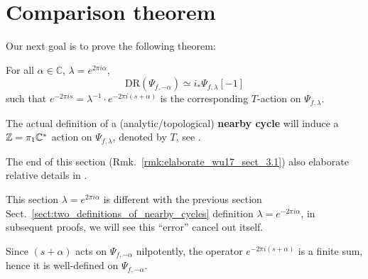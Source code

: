 \section{Comparison theorem}
Our next goal is to prove the following theorem:
\begin{theorem}[Comparison] \label{Theorem 9.5}
    For all $\alpha \in \mathbb{C}$, $\lambda = e^{2\pi i\alpha}$,
    $$
        \mathrm{DR}(\Psi_{f,-\alpha}) \simeq i_* \Psi_{f,\lambda}[-1]
    $$
    such that $e^{-2\pi is} = \lambda^{-1}\cdot e^{-2\pi i(s+\alpha)}$ is the corresponding $T$-action on $\Psi_{f,\lambda}$.
\end{theorem}
\begin{remark}
    The actual definition of a (analytic/topological) \textbf{nearby cycle} will induce a $\mathbb{Z} = \pi_1{\mathbb{C}^*}$ action on $\Psi_{f,\lambda}$, denoted by $T$, see \cite[\S~3.1]{Wu2017NearbyVanishingCycles}.

    The end of this section (Rmk.~\ref{rmk:elaborate_wu17_sect_3.1}) also elaborate relative details in \cite[\S~3.1]{Wu2017NearbyVanishingCycles}.
\end{remark}
\begin{remark}\label{rmk:different_definitions_of_lambda}
    This section $\lambda = e^{2\pi i \alpha}$ is different with the previous section Sect.~\ref{sect:two_definitions_of_nearby_cycles} definition $\lambda = e^{-2\pi i \alpha}$,
    in subsequent proofs, we will see this ``error'' cancel out itself.
\end{remark}
\begin{remark}
    Since $(s+\alpha)$ acts on $\Psi_{f,-\alpha}$ nilpotently, the operator $e^{-2\pi i(s+\alpha)}$ is a finite sum, hence it is well-defined on $\Psi_{f,-\alpha}$.
\end{remark}

